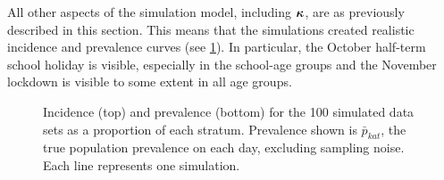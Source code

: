 \documentclass[thesis.tex]{subfiles}
\begin{document}
All other aspects of the simulation model, including $\bm{\kappa}$, are as previously described in this section.
This means that the simulations created realistic incidence and prevalence curves (see \cref{SEIR:fig:sim-data}).
In particular, the October half-term school holiday is visible, especially in the school-age groups and the November lockdown is visible to some extent in all age groups.
\begin{figure}
    \vspace{-3cm}
    \caption[Simulated data]{%
        Incidence (top) and prevalence (bottom) for the 100 simulated data sets as a proportion of each stratum.
        Prevalence shown is $\bar{p}_{kat}$, the true population prevalence on each day, excluding sampling noise.
        Each line represents one simulation.
    }
    \label{SEIR:fig:sim-data}
\end{figure}

\end{document}
